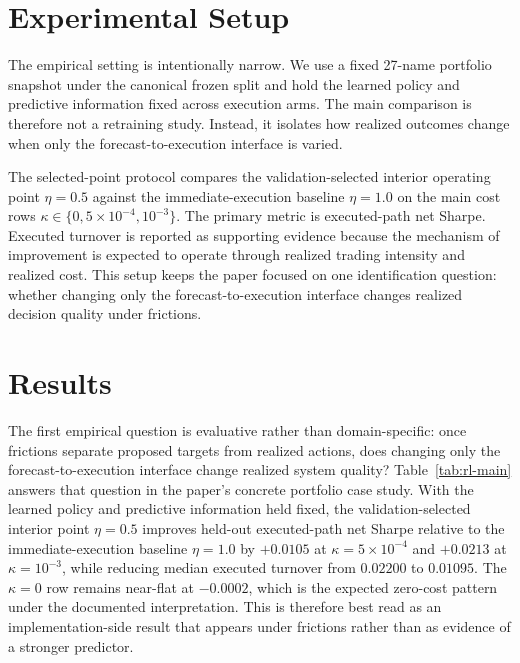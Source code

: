 \documentclass[10pt,twocolumn]{article}
\begin{document}
\section{Experimental Setup}

The empirical setting is intentionally narrow. We use a fixed 27-name portfolio snapshot under the canonical frozen split and hold the learned policy and predictive information fixed across execution arms. The main comparison is therefore not a retraining study. Instead, it isolates how realized outcomes change when only the forecast-to-execution interface is varied.

The selected-point protocol compares the validation-selected interior operating point $\eta=0.5$ against the immediate-execution baseline $\eta=1.0$ on the main cost rows $\kappa\in\{0, 5\times10^{-4}, 10^{-3}\}$. The primary metric is executed-path net Sharpe. Executed turnover is reported as supporting evidence because the mechanism of improvement is expected to operate through realized trading intensity and realized cost. This setup keeps the paper focused on one identification question: whether changing only the forecast-to-execution interface changes realized decision quality under frictions.

\section{Results}

The first empirical question is evaluative rather than domain-specific: once frictions separate proposed targets from realized actions, does changing only the forecast-to-execution interface change realized system quality? Table~\ref{tab:rl-main} answers that question in the paper's concrete portfolio case study. With the learned policy and predictive information held fixed, the validation-selected interior point $\eta=0.5$ improves held-out executed-path net Sharpe relative to the immediate-execution baseline $\eta=1.0$ by $+0.0105$ at $\kappa=5\times10^{-4}$ and $+0.0213$ at $\kappa=10^{-3}$, while reducing median executed turnover from $0.02200$ to $0.01095$. The $\kappa=0$ row remains near-flat at $-0.0002$, which is the expected zero-cost pattern under the documented interpretation. This is therefore best read as an implementation-side result that appears under frictions rather than as evidence of a stronger predictor.
\end{document}
